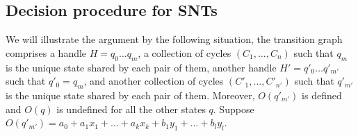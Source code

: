 \documentclass[runningheads,a4paper]{llncs}
\def\Aa{{\mathcal{A} }}
\def\Bb{{\mathscr{B} }}
\def\Cc{{\mathcal{C} }}
\def\Ss{{\mathcal{S} }}
\def\schm{{\mathfrak{s} }}
\newcommand\intnum{{\mathbb{Z} }}
\newcommand\ltrue{\mathsf{true}}
\newcommand\lfalse{\mathsf{false}}
\begin{document}

%
%
%
%



\subsection{Decision procedure for SNTs}

We will illustrate the argument by the following situation, the transition graph comprises a handle $H=q_0\dots q_{m}$,  a collection of cycles $(C_1,\dots,C_n)$ such that $q_m$ is the unique state shared by each pair of them, another handle $H'=q'_0 \dots q'_{m'}$ such that $q'_0=q_m$, and another collection of cycles $(C'_1,\dots,C'_{n'})$ such that $q'_{m'}$ is the unique state shared by each pair of them. Moreover, $O(q'_{m'})$ is defined and $O(q)$ is undefined for all the other states $q$. Suppose $O(q'_{m'}) = a_0 + a_1 x_1 + \dots + a_k x_k + b_1 y_1 + \dots + b_l y_l$.
\end{document}
